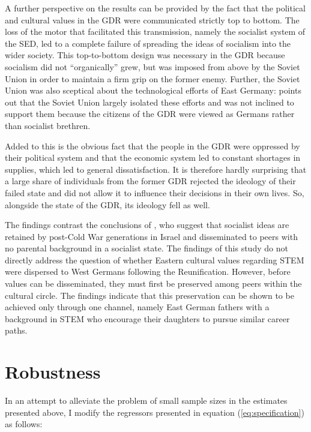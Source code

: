 \documentclass[a4paper, oneside, hyperfootnotes = false]{article}
\begin{document}
{A further perspective on the results can be provided by the fact that the political and cultural values in the GDR were communicated strictly top to bottom.
The loss of the motor that facilitated this transmission, namely the socialist system of the SED, led to a complete failure of spreading the ideas of socialism into the wider society.
This top-to-bottom design was necessary in the GDR because socialism did not ``organically'' grew, but was imposed from above by the Soviet Union in order to maintain a firm grip on the former enemy.
Further, the Soviet Union was also sceptical about the technological efforts of East Germany:
\cite{Hoegselius2009} points out that the Soviet Union largely isolated these efforts and was not inclined to support them because the citizens of the GDR were viewed as Germans rather than socialist brethren.

Added to this is the obvious fact that the people in the GDR were oppressed by their political system and that the economic system led to constant shortages in supplies, which led to general dissatisfaction.
It is therefore hardly surprising that a large share of individuals from the former GDR rejected the ideology of their failed state and did not allow it to influence their decisions in their own lives.
So, alongside the state of the GDR, its ideology fell as well.

The findings contrast the conclusions of \cite{FriedmanSokuler2020}, who suggest that socialist ideas are retained by post-Cold War generations in Israel and disseminated to peers with no parental background in a socialist state.
The findings of this study do not directly address the question of whether Eastern cultural values regarding STEM were dispersed to West Germans following the Reunification.
However, before values can be disseminated, they must first be preserved among peers within the cultural circle.
The findings indicate that this preservation can be shown to be achieved only through one channel, namely East German fathers with a background in STEM who encourage their daughters to pursue similar career paths.

\section{Robustness}
\label{robustness}

In an attempt to alleviate the problem of small sample sizes in the estimates presented above, I modify the regressors presented in equation (\ref{eq:specification}) as follows:

}
\end{document}
